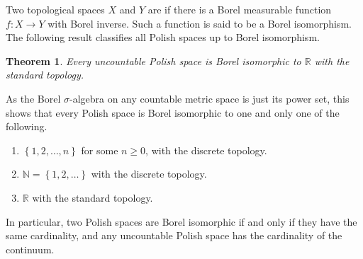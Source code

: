 \documentclass[12pt]{article}
\newtheorem*{theorem*}{Theorem}
\begin{document}

Two topological spaces $X$ and $Y$ are  if there is a Borel measurable function $f\colon X\rightarrow Y$ with Borel inverse. Such a function is said to be a Borel isomorphism. The following result classifies all Polish spaces up to Borel isomorphism.

\begin{theorem*}
Every uncountable Polish space is Borel isomorphic to $\mathbb{R}$ with the standard topology.
\end{theorem*}

As the Borel $\sigma$-algebra on any countable metric space is just its power set, this shows that every Polish space is Borel isomorphic to one and only one of the following.

\begin{enumerate}
\item $\left\{1,2,\ldots,n\right\}$ for some $n\ge 0$, with the discrete topology.
\item $\mathbb{N}=\left\{1,2,\ldots\right\}$ with the discrete topology.
\item $\mathbb{R}$ with the standard topology.
\end{enumerate}

In particular, two Polish spaces are Borel isomorphic if and only if they have the same cardinality, and any uncountable Polish space has the cardinality of the continuum.

\end{document}
